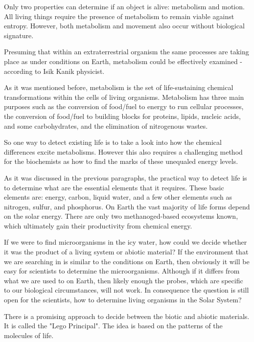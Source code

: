 Only two properties can determine if an object is alive:
metabolism and motion. All living things require the presence of metabolism to remain viable against entropy. However, both metabolism and movement also occur without biological signature.

Presuming that within an extraterrestrial organism the same processes are taking place as under conditions on Earth, metabolism could be effectively examined - according to Isik Kanik physicist.
\cite{astrobio}


As it was mentioned before, metabolism is the set of life-sustaining chemical transformations within the cells of living organisms. Metabolism has three main purposes such as the conversion of food/fuel to energy to run cellular processes, the conversion of food/fuel to building blocks for proteins, lipids, nucleic acids, and some carbohydrates, and the elimination of nitrogenous wastes.
\cite{wiki:metabolism}


So one way to detect existing life is to take a look into how the chemical differences excite metabolisms. However this also requires a challenging method for the biochemists as how to find the marks of these unequaled energy levels.

As it was discussed in the previous paragraphs, the practical way to detect life is to determine what are the essential elements that it requires. These basic elements are: energy, carbon, liquid water, and a few other elements such as nitrogen, sulfur, and phosphorus.
On Earth the vast majority of life forms depend on the solar energy. There are only two methanoged-based ecosystems known, which ultimately gain their productivity from chemical energy.
\cite{10.1371/journal.pbio.0020302}


If we were to find microorganisms in the icy water, how could we decide whether it was the product of a living system or abiotic material? If the environment that we are searching in is similar to the conditions on Earth, then obviously it will be easy for scientists to determine the microorganisms. Although if it differs from what we are used to on Earth, then likely enough the probes, which are specific to our biological circumstances, will not work. In consequence the question is still open for the scientists, how to determine living organisms in the Solar System?

There is a promising approach to decide between the biotic and abiotic materials. It is called the "Lego Principal". The idea is based on the patterns of the molecules of life.

